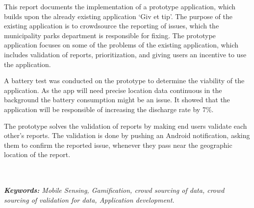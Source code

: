 {\noindent This report documents the implementation of a prototype application, which builds upon the already existing application ‘Giv et tip’. The purpose of the existing application is to crowdsource the reporting of issues, which the municipality parks department is responsible for fixing. The prototype application focuses on some of the problems of the existing application, which includes validation of reports, prioritization, and giving users an incentive to use the application.}

{\noindent A battery test was conducted on the prototype to determine the viability of the application. As the app will need precise location data continuous in the background the battery consumption might be an issue. It showed that the application will be responsible of increasing the discharge rate by 7\%.}

{\noindent The prototype solves the validation of reports by making end users validate each other's reports. The validation is done by pushing an Android notification, asking them to confirm the reported issue, whenever they pass near the geographic location of the report.}


~\\~\\
{\noindent \textit{\textbf{Keywords:} Mobile Sensing, Gamification, crowd sourcing of data, crowd sourcing of validation for data, Application development.}}